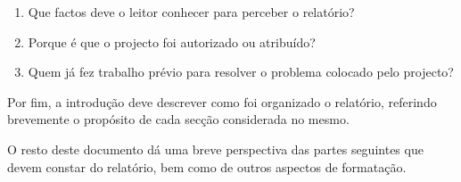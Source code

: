 \begin{enumerate}
 \item Que factos deve o leitor conhecer para perceber o relatório?
 \item Porque é que o projecto foi autorizado ou atribuído?
 \item Quem já fez trabalho prévio para resolver o problema colocado pelo projecto?
\end{enumerate}

Por fim, a introdução deve descrever como foi organizado o relatório, referindo brevemente o propósito de cada secção considerada no mesmo.

O resto deste documento dá uma breve perspectiva das partes seguintes que devem constar do relatório, bem como de outros aspectos de formatação.
